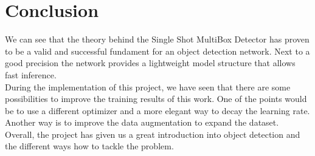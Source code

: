 
\section{Conclusion}
\label{section:conclusion}

We can see that the theory behind the Single Shot MultiBox Detector has proven to be a valid and successful fundament for an object detection network. Next to a good precision the network provides a lightweight model structure that allows fast inference. \\

During the implementation of this project, we have seen that there are some possibilities to improve the training results of this work. One of the points would be to use a different optimizer and a more elegant way to decay the learning rate. Another way is to improve the data augmentation to expand the dataset. \\

Overall, the project has given us a great introduction into object detection and the different ways how to tackle the problem.
